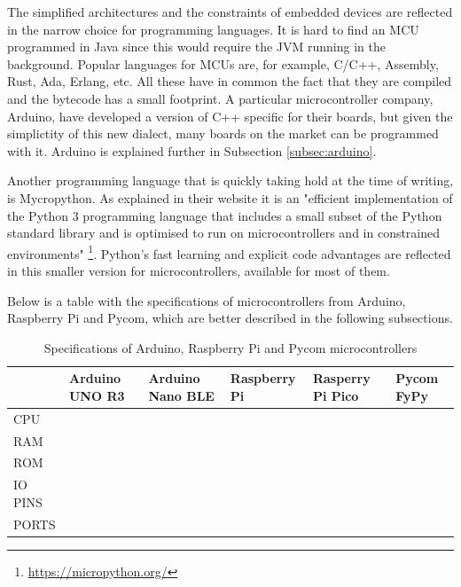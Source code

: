 		The simplified architectures and the constraints of embedded devices are reflected in the narrow choice for programming languages.
		It is hard to find an MCU programmed in Java since this would require the JVM running in the background.
		Popular languages for MCUs are, for example, C/C++, Assembly, Rust, Ada, Erlang, etc.
		All these have in common the fact that they are compiled and the bytecode has a small footprint.
		A particular microcontroller company, Arduino, have developed a version of C++ specific for their boards, but given the simplictity of this new dialect, many boards on the market can be programmed with it.
		Arduino is explained further in Subsection \ref{subsec:arduino}.
	
		Another programming language that is quickly taking hold at the time of writing, is Mycropython.
		As explained in their website it is an "efficient implementation of the Python 3 programming language that includes a small subset of the Python standard library and is optimised to run on microcontrollers and in constrained environments" \footnote{\url{https://micropython.org/}}.
		Python's fast learning and explicit code advantages are reflected in this smaller version for microcontrollers, available for most of them.
		
		Below is a table with the specifications of microcontrollers from Arduino, Raspberry Pi and Pycom, which are better described in the following subsections.
		\begin{table}[htbp]
			\begin{center}
				\begin{tabularx}{\textwidth}{@{}|Y|Y|Y|Y|Y|Y|@{}} 
					\hline
					& Arduino UNO R3 & Arduino Nano BLE & Raspberry Pi & Rasperry Pi Pico & Pycom FyPy \\\hline
						CPU &&&&& \\\hline
						RAM &&&&& \\\hline
						ROM &&&&& \\\hline
						IO PINS &&&&& \\\hline
						PORTS &&&&& \\\hline
				\end{tabularx}
				\caption{Specifications of Arduino, Raspberry Pi and Pycom microcontrollers}
				\label{table:1}
			\end{center}
		\end{table}
	
